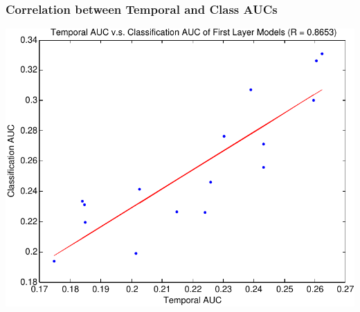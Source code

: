 \documentclass{beamer}
\begin{document}
\begin{frame}
\frametitle{Correlation between Temporal and Class AUCs}
\centering
\includegraphics[scale=0.4]{./Figures/Project1/scatter-crop.pdf}\\
\end{frame} 
\end{document}
